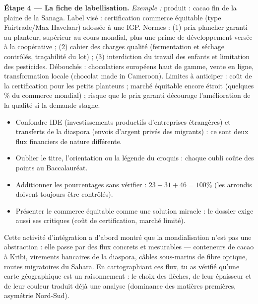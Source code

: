 \documentclass[11pt]{article}
\newcommand{\cle}[1]{{\popxbold\color{popdark}#1}}
\newcounter{popsec}
\newcounter{popsub}
\newcommand{\courssub}[1]{%
  \stepcounter{popsub}%
  \par\vspace{9pt}\noindent{\popxbold\fontsize{11.5}{13}\selectfont\color{popink}{\color{poporange}\thepopsec.\thepopsub}\hspace{6pt}#1}\par\nopagebreak\vspace{4pt}
}
\begin{document}
\begin{exoresolu}
\textbf{Étape 4 — La fiche de labellisation.} \emph{Exemple :} produit : cacao fin de la plaine de la Sanaga. Label visé : certification commerce équitable (type Fairtrade/Max Havelaar) adossée à une IGP. Normes : (1) prix plancher garanti au planteur, supérieur au cours mondial, plus une prime de développement versée à la coopérative ; (2) cahier des charges qualité (fermentation et séchage contrôlés, traçabilité du lot) ; (3) interdiction du travail des enfants et limitation des pesticides. Débouchés : chocolatiers européens haut de gamme, vente en ligne, transformation locale (chocolat made in Cameroon). Limites à anticiper : coût de la certification pour les petits planteurs ; marché équitable encore étroit (quelques \% du commerce mondial) ; risque que le prix garanti décourage l'amélioration de la qualité si la demande stagne.
\end{exoresolu}

\begin{attention}
\begin{itemize}
\item Confondre \cle{IDE} (investissements productifs d'entreprises étrangères) et \cle{transferts de la diaspora} (envois d'argent privés des migrants) : ce sont deux flux financiers de nature différente.
\item Oublier le titre, l'orientation ou la légende du croquis : chaque oubli coûte des points au Baccalauréat.
\item Additionner les pourcentages sans vérifier : $23 + 31 + 46 = 100\%$ (les arrondis doivent toujours être contrôlés).
\item Présenter le commerce équitable comme une solution miracle : le dossier exige aussi ses \cle{critiques} (coût de certification, marché limité).
\end{itemize}
\end{attention}

\courssub{Bilan de l'activité}

Cette activité d'intégration a d'abord montré que la mondialisation n'est pas une abstraction : elle passe par des \cle{flux concrets} et mesurables — conteneurs de cacao à Kribi, virements bancaires de la diaspora, câbles sous-marins de fibre optique, routes migratoires du Sahara. En cartographiant ces flux, tu as vérifié qu'une carte géographique est un \cle{raisonnement} : le choix des flèches, de leur épaisseur et de leur couleur traduit déjà une analyse (dominance des matières premières, asymétrie Nord-Sud).
\end{document}
